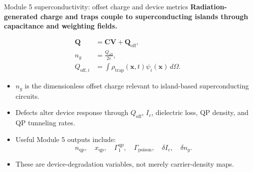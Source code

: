 \documentclass[aspectratio=169,10pt]{beamer}
\begin{document}
\begin{frame}{Module 5 superconductivity: offset charge and device metrics}
\footnotesize
\textbf{Radiation-generated charge and traps couple to superconducting islands through capacitance and weighting fields.}

\vspace{-0.15em}
\begin{align*}
\mathbf Q&=\mathbf C\mathbf V+\mathbf Q_{\mathrm{off}},\\[-0.05em]
 n_g&=\frac{Q_{\mathrm{off}}}{2e},\\[-0.05em]
Q_{\mathrm{off},i}&=\int \rho_{\mathrm{trap}}(\mathbf x,t)\psi_i(\mathbf x)\,d\Omega.
\end{align*}

\vspace{-0.25em}
\begin{itemize}
    \item $n_g$ is the dimensionless offset charge relevant to island-based superconducting circuits.
    \item Defects alter device response through $Q_{\mathrm{off}}$, $I_c$, dielectric loss, QP density, and QP tunneling rates.
    \item Useful Module 5 outputs include:
    \[
        n_{\mathrm{qp}},\quad x_{\mathrm{qp}},\quad \Gamma_1^{\mathrm{qp}},\quad
        \Gamma_{\mathrm{poison}},\quad\delta I_c,\quad \delta n_g.
    \]
    \item These are device-degradation variables, not merely carrier-density maps.
\end{itemize}
\end{frame}
\end{document}
